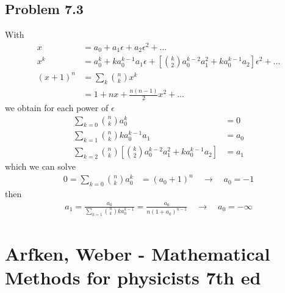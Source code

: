 \documentclass[../main.tex]{subfiles}
\begin{document}
\subsection{Problem 7.3}
With
\begin{align}
x&=a_0+a_1\epsilon+a_2\epsilon^2+...\\
x^k&=a_0^k+ka_0^{k-1}a_1\epsilon+\left[\binom{k}{2}a_0^{k-2}a_1^2+ka_0^{k-1}a_2\right]\epsilon^2+...\\
(x+1)^n
&=\sum_k\binom{n}{k}x^k\\
&=1+nx+\frac{n(n-1)}{2}x^2+...
\end{align}
we obtain for each power of $\epsilon$
\begin{align}
\sum_{k=0}\binom{n}{k}a_0^k&=0\\
\sum_{k=1}\binom{n}{k}ka_0^{k-1}a_1&=a_0\\
\sum_{k=2}\binom{n}{k}\left[\binom{k}{2}a_0^{k-2}a_1^2+ka_0^{k-1}a_2\right]&=a_1
\end{align}
which we can solve
\begin{align*}
0=\sum_{k=0}\binom{n}{k}a_0^k&=(a_0+1)^n\quad\rightarrow\quad a_0=-1
\end{align*}
then
\begin{align}
a_1=\frac{a_0}{\sum_{k=1}\binom{n}{k}ka_0^{k-1}}=\frac{a_0}{n(1+a_0)^{n-1}}\quad\rightarrow\quad a_0=-\infty
\end{align}

\section{{\sc Arfken, Weber} - Mathematical Methods for physicists 7th ed}
\end{document}
